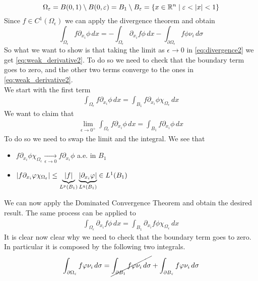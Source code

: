 \[
    \Omega_\epsilon = B(0, 1) \setminus B(0, \epsilon) = B_1 \setminus B_\epsilon = \left\{ x \in \real^n \mid \epsilon < \abs{x} < 1 \right\}
\]
Since \(f \in C^1(\Omega_\epsilon)\) we can apply the divergence theorem and
obtain
\begin{equation}\label{eq:divergence2}
    \int_{\Omega_\epsilon} f \partial_{x_i} \phi \, dx = -\int_{\Omega_\epsilon} \partial_{x_i} f \phi \, dx - \int_{\partial\Omega_\epsilon} f \phi \nu_i \, d\sigma
\end{equation}
So what we want to show is that taking the limit as \(\epsilon \to 0\) in \eqref{eq:divergence2} we get \eqref{eq:weak_derivative2}.
To do so we need to check that the boundary term goes to zero, and the other two terms converge to the ones in \eqref{eq:weak_derivative2}. \\
We start with the first term
\[
    \begin{split}
        \int_{\Omega_\epsilon} f \partial_{x_i} \phi \, dx = \int_{B_1} f \partial_{x_i} \phi \chi_{\Omega_\epsilon} \, dx
    \end{split}
\]
We want to claim that
\[
    \begin{split}
        \lim_{\epsilon \to 0^+} \int_{\Omega_\epsilon} f \partial_{x_i} \phi \, dx = \int_{B_1} f \partial_{x_i} \phi \, dx
    \end{split}
\]
To do so we need to swap the limit and the integral. We see that
\begin{itemize}
    \item \(f \partial_{x_i} \phi \chi_{\Omega_\epsilon} \underset{\epsilon \to 0}{\longrightarrow} f \partial_{x_i} \phi\) a.e. in \(B_1\)
    \item \(\abs{f \partial_{x_i} \phi \chi_{\Omega_\epsilon}} \leq \underbrace{\abs{f}}_{L^p(B_1)} \underbrace{\abs{\partial_{x_i} \phi}}_{L^q(B_1)} \in L^1(B_1)\)
\end{itemize}
We can now apply the Dominated Convergence Theorem and obtain the desired result.
The same process can be applied to
\[
    \begin{split}
        \int_{\Omega_\epsilon} \partial_{x_i} f \phi \, dx = \int_{B_1} \partial_{x_i} f \phi \chi_{\Omega_\epsilon} \, dx
    \end{split}
\]
It is clear now clear why we need to check that the boundary term goes to zero.
In particular it is composed by the following two integrals.
\[
    \begin{split}
        \int_{\partial\Omega_\epsilon} f \phi \nu_i \, d\sigma = \cancel{\int_{\partial B_1} f \phi \nu_i \, d\sigma} + \int_{\partial B_\epsilon} f \phi \nu_i \, d\sigma
    \end{split}
\]
